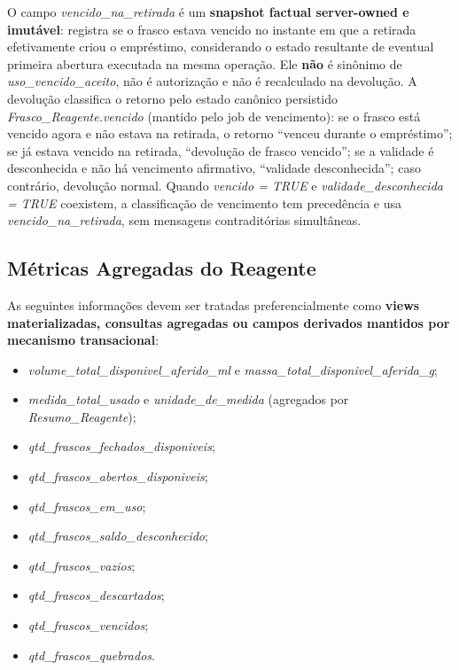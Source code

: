 \begin{explicacao}
O campo \textit{vencido\_na\_retirada} é um \textbf{snapshot factual server-owned e imutável}: registra se o frasco estava vencido no instante em que a retirada efetivamente criou o empréstimo, considerando o estado resultante de eventual primeira abertura executada na mesma operação. Ele \textbf{não} é sinônimo de \textit{uso\_vencido\_aceito}, não é autorização e não é recalculado na devolução. A devolução classifica o retorno pelo estado canônico persistido \textit{Frasco\_Reagente.vencido} (mantido pelo job de vencimento): se o frasco está vencido agora e não estava na retirada, o retorno ``venceu durante o empréstimo''; se já estava vencido na retirada, ``devolução de frasco vencido''; se a validade é desconhecida e não há vencimento afirmativo, ``validade desconhecida''; caso contrário, devolução normal. Quando \textit{vencido = TRUE} e \textit{validade\_desconhecida = TRUE} coexistem, a classificação de vencimento tem precedência e usa \textit{vencido\_na\_retirada}, sem mensagens contraditórias simultâneas.
\end{explicacao}



\subsection{Métricas Agregadas do Reagente}
\begin{explicacao}
As seguintes informações devem ser tratadas preferencialmente como \textbf{views materializadas, consultas agregadas ou campos derivados mantidos por mecanismo transacional}:
\begin{itemize}
\item \textit{volume\_total\_disponivel\_aferido\_ml} e \textit{massa\_total\_disponivel\_aferida\_g};
\item \textit{medida\_total\_usado} e \textit{unidade\_de\_medida} (agregados por \textit{Resumo\_Reagente});
\item \textit{qtd\_frascos\_fechados\_disponiveis};
\item \textit{qtd\_frascos\_abertos\_disponiveis};
\item \textit{qtd\_frascos\_em\_uso};
\item \textit{qtd\_frascos\_saldo\_desconhecido};
\item \textit{qtd\_frascos\_vazios};
\item \textit{qtd\_frascos\_descartados};
\item \textit{qtd\_frascos\_vencidos};
\item \textit{qtd\_frascos\_quebrados}.
\end{itemize}
\end{explicacao}


